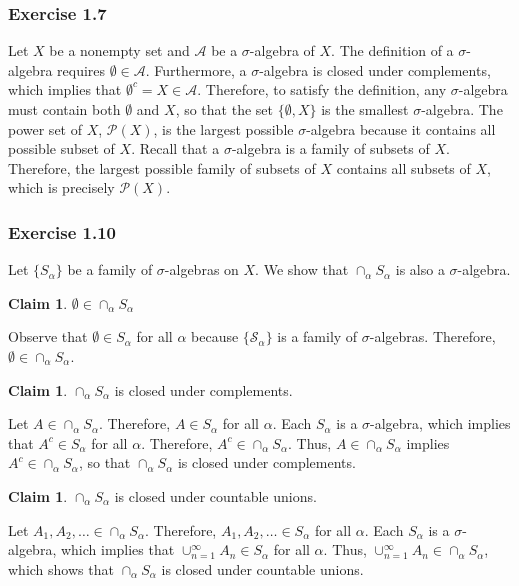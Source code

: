 \documentclass[letterpaper,12pt]{article}
\theoremstyle{definition}
\newtheorem{claim}[theorem]{Claim}
\begin{document}
\subsubsection*{Exercise 1.7}
Let $X$ be a nonempty set and $\mathcal{A}$ be a $\sigma$-algebra of $X$. The definition of a $\sigma$-algebra requires $\emptyset \in \mathcal{A}$. Furthermore, a $\sigma$-algebra is closed under complements, which implies that $\emptyset^c = X \in \mathcal{A}$. Therefore, to satisfy the definition, any $\sigma$-algebra must contain both $\emptyset$ and $X$, so that the set $\{\emptyset, X\}$ is the smallest $\sigma$-algebra. The power set of $X$, $\mathcal{P}(X)$, is the largest possible $\sigma$-algebra because it contains all possible subset of $X$. Recall that a $\sigma$-algebra is a family of subsets of $X$. Therefore, the largest possible family of subsets of $X$ contains all subsets of $X$, which is precisely $\mathcal{P}(X)$.

\subsubsection*{Exercise 1.10}
Let $\{S_{\alpha}\}$ be a family of $\sigma$-algebras on $X$. We show that $\cap_{\alpha} S_{\alpha}$ is also a $\sigma$-algebra.

\begin{claim}
  $\emptyset \in \cap_{\alpha} S_{\alpha}$
\end{claim}
Observe that $\emptyset \in {S}_{\alpha}$ for all $\alpha$ because $\{\mathcal{S}_{\alpha}\}$ is a family of $\sigma$-algebras. Therefore, $\emptyset \in \cap_{\alpha} S_{\alpha}$.

\begin{claim}
  $\cap_{\alpha} S_{\alpha}$ is closed under complements.
\end{claim}
Let $A \in \cap_{\alpha} S_{\alpha}$. Therefore, $A \in S_{\alpha}$ for all $\alpha$. Each $S_{\alpha}$ is a $\sigma$-algebra, which implies that $A^c \in S_{\alpha}$ for all $\alpha$. Therefore, $A^c \in \cap_{\alpha} S_{\alpha}$. Thus, $A \in \cap_{\alpha} S_{\alpha}$ implies $A^c \in \cap_{\alpha} S_{\alpha}$, so that $\cap_{\alpha} S_{\alpha}$ is closed under complements.

\begin{claim}
  $\cap_{\alpha} S_{\alpha}$ is closed under countable unions.
\end{claim}
Let $A_1, A_2, \ldots \in \cap_{\alpha} S_{\alpha}$. Therefore, $A_1, A_2, \ldots \in S_{\alpha}$ for all $\alpha$. Each $S_{\alpha}$ is a $\sigma$-algebra, which implies that $\cup_{n=1}^{\infty} A_n \in S_{\alpha}$ for all $\alpha$. Thus, $\cup_{n=1}^{\infty} A_n \in \cap_{\alpha} S_{\alpha}$, which shows that $\cap_{\alpha} S_{\alpha}$ is closed under countable unions.
\end{document}
